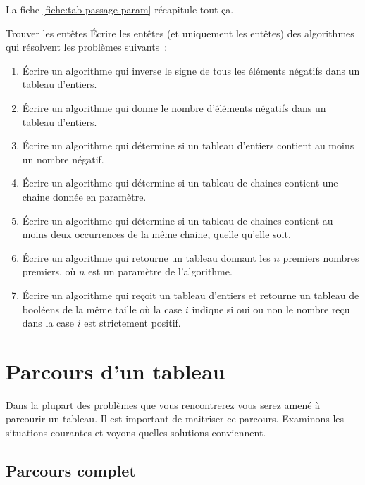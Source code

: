 			La fiche \vref{fiche:tab-passage-param} récapitule tout ça.

			\begin{Exercice}{Trouver les entêtes}
				Écrire les entêtes (et uniquement les entêtes)
				des algorithmes qui résolvent les problèmes suivants~:
				\begin{enumerate}[label=\alph*)]
				\item
					Écrire un algorithme qui 
					inverse le signe de tous les éléments négatifs dans un tableau d’entiers.
				\item
					Écrire un algorithme qui
					donne le nombre d’éléments négatifs dans un tableau d’entiers.
				\item
					Écrire un algorithme qui
					détermine si un tableau d’entiers contient au moins un nombre négatif.
				\item
					Écrire un algorithme qui
					détermine si un tableau de chaines contient
					une chaine donnée en paramètre.
				\item
					Écrire un algorithme qui
					détermine si un tableau de chaines contient
					au moins deux occurrences de la même chaine,
					quelle qu’elle soit.
				\item
					Écrire un algorithme qui 
					retourne un tableau donnant les $n$ premiers nombres premiers,
					où $n$ est un paramètre de l’algorithme.
				\item
					Écrire un algorithme qui 
					reçoit un tableau d’entiers
					et retourne un tableau de booléens de la même taille
					où la case $i$ indique si oui ou non
					le nombre reçu dans la case $i$ est strictement positif.
				\end{enumerate}
			\end{Exercice}
		
	\section{Parcours d’un tableau} 
	\label{Les parcours de tableaux}

		Dans la plupart des problèmes que vous rencontrerez
		vous serez amené à parcourir un tableau.
		Il est important de maitriser ce parcours.
		Examinons les situations courantes 
		et voyons quelles solutions conviennent.
	
		\subsection{Parcours complet}
		
